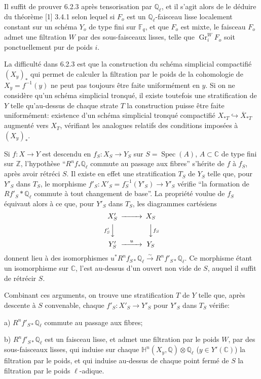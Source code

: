 \documentclass[12pt,a4paper]{article}
\theoremstyle{plain}
\theoremstyle{definition}
\theoremstyle{remark}
\DeclareMathOperator{\Spec}{Spec}
\DeclareMathOperator{\Gr}{Gr}
\newcommand{\CC}{\mathbb{C}}
\newcommand{\FF}{\mathbb{F}}
\newcommand{\HH}{\mathbb{H}}
\newcommand{\QQ}{\mathbb{Q}}
\newcommand{\ZZ}{\mathbb{Z}}
\begin{document}
Il suffit de prouver 6.2.3 apr\`es tensorisation par $\QQ_{\ell}$, et il s'agit alors de le d\'eduire du th\'eor\`eme [1] 3.4.1 selon lequel si $F_o$ est un $\QQ_{\ell}$-faisceau lisse localement constant sur un sch\'ema $Y_o$ de type fini sur $\FF_q$, et que $F_o$ est mixte, le faisceau $F_o$ admet une filtration $W$ par des sous-faisceaux lisses, telle que $\Gr_i^W F_o$ soit ponctuellement pur de poids $i$.

La difficult\'e dans 6.2.3 est que la construction du sch\'ema simplicial compactifi\'e $(X_y)_*$ qui permet de calculer la filtration par le poids de la cohomologie de $X_y = f^{-1}(y)$ ne peut pas toujours \^etre faite uniform\'ement en $y$. Si on ne consid\`ere qu'un sch\'ema simplicial tronqu\'e, il existe toutefois une stratification de $Y$ telle qu'au-dessus de chaque strate $T$ la construction puisse \^etre faite uniform\'ement: existence d'un sch\'ema simplicial tronqu\'e compactifi\'e $X_{*T} \hookrightarrow \overline{X}_{*T}$ augment\'e vers $X_T$, v\'erifiant les analogues relatifs des conditions impos\'ees \`a $(X_y)_*$.

Si $f: X \to Y$ est descendu en $f_S: X_S \to Y_S$ sur $S = \Spec(A)$, $A \subset \CC$ de type fini sur $\ZZ$, l'hypoth\`ese ``$R^nf_*\QQ_{\ell}$ commute au passage aux fibres'' s'h\'erite de $f$ \`a $f_S$, apr\`es avoir r\'etr\'eci $S$. Il existe en effet une stratification $T_S$ de $Y_S$ telle que, pour $Y'_S$ dans $T_S$, le morphisme $f'_S: X'_S = f_S^{-1}(Y'_S) \to Y'_S$ v\'erifie ``la formation de $Rf'_S*\QQ_{\ell}$ commute \`a tout changement de base''. La propri\'et\'e voulue de $f_S$ \'equivaut alors \`a ce que, pour $Y'_S$ dans $T_S$, les diagrammes cart\'esiens
\[
\begin{CD}
X'_S @>>> X_S \\
@V{f'_S}VV @VV{f_S}V \\
Y'_S @>{u}>> Y_S
\end{CD}
\]
donnent lieu \`a des isomorphismes $u^*R^nf_{S*}\QQ_{\ell} \xrightarrow{\sim} R^nf'_{S*}\QQ_{\ell}$. Ce morphisme \'etant un isomorphisme sur $\CC$, l'est au-dessus d'un ouvert non vide de $S$, auquel il suffit de r\'etr\'ecir $S$.

Combinant ces arguments, on trouve une stratification $T$ de $Y$ telle que, apr\`es descente \`a $S$ convenable, chaque $f'_S: X'_S \to Y'_S$ pour $Y'_S$ dans $T_S$ v\'erifie:

a) $R^nf'_{S*}\QQ_{\ell}$ commute au passage aux fibres;

b) $R^nf'_{S*}\QQ_{\ell}$ est un faisceau lisse, et admet une filtration par le poids $W$, par des sous-faisceaux lisses, qui induise sur chaque $\HH^n(X_y, \QQ) \otimes \QQ_{\ell}$ ($y \in Y'(\CC)$) la filtration par le poids, et qui induise au-dessus de chaque point ferm\'e de $S$ la filtration par le poids $\ell$-adique.
\end{document}
